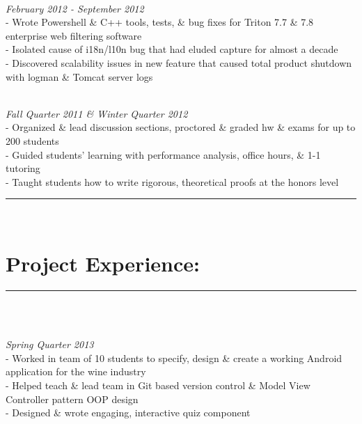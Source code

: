 \documentclass{article}
\newcommand{\sline}{\noindent\rule{575pt}{0.5pt}}
\begin{document}
\begin{spacing}{1.0}
  \\
\hfill {\sl February 2012 - September 2012} \\
\indent \indent - Wrote Powershell \& C++ tools, tests, \& bug fixes for
                  Triton 7.7 \& 7.8 enterprise web filtering software\\
\indent \indent - Isolated cause of i18n/l10n bug that had eluded capture for
                  almost a decade \\
\indent \indent - Discovered scalability issues in new feature that caused total
                  product shutdown with logman \& Tomcat server logs
\end{spacing}

\begin{spacing}{1.0}
 \\
\hfill  {\sl Fall Quarter 2011 \& Winter Quarter 2012} \\
\indent \indent - Organized \& lead discussion sections, proctored \& graded
                  hw \& exams for up to 200 students\\
\indent \indent - Guided students' learning with performance analysis, office
                  hours, \& 1-1 tutoring \\
\indent \indent - Taught students how to write rigorous, theoretical proofs at
                  the honors level
\end{spacing}
\hfill

\sline \\
\section*{Project Experience:}
\sline \\

\begin{spacing}{1.0}
 \\
\hfill {\sl Spring Quarter 2013} \\
\indent \indent - Worked in team of 10 students to specify, design \&
                  create a working Android application for the wine industry \\
\indent \indent - Helped teach \& lead team in Git based version control \&
                  Model View Controller pattern OOP design \\
\indent \indent - Designed \& wrote engaging, interactive quiz component
\end{spacing}
\end{document}
